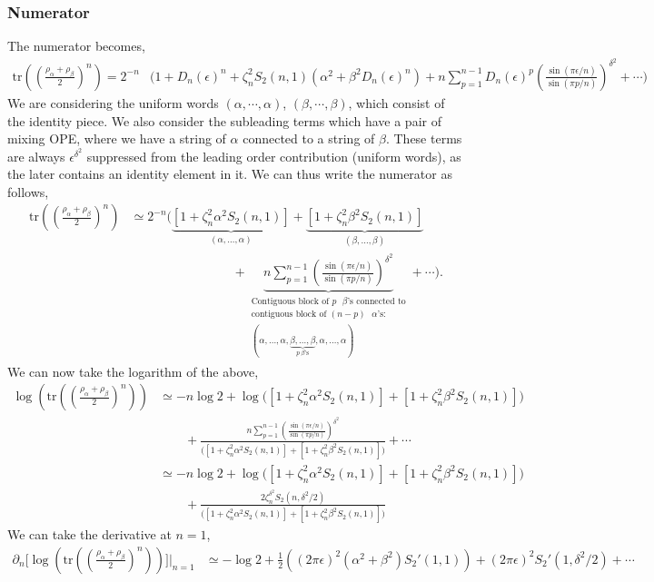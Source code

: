 \documentclass[11pt]{article}
\newcommand{\ep}{\epsilon}
\newcommand{\p}{\partial}
\newcommand{\nn}{\nonumber}
\newcommand{\lb}{\left(}
\newcommand{\rb}{\right)}
\begin{document}
\subsubsection{Numerator}
The numerator becomes,
\begin{align}
    \text{tr}\lb\lb \frac{ \rho_\alpha + \rho_\beta}{2}\rb^n\rb =2^{-n}&\Bigg( 1+ D_n(\ep)^n + \zeta_n^2S_2(n,1)\lb \alpha^2 + \beta^2 D_n(\ep)^n\rb +  n\sum_{p=1}^{n-1}D_n(\ep)^p \lb\frac{\sin(\pi\ep/n)}{\sin(\pi p/n)}\rb^{\delta^2} + \cdots \Bigg)
\end{align}
We are considering the uniform words  $(\alpha,\cdots,\alpha)$, $(\beta,\cdots,\beta)$, which consist of the identity piece. We also consider the subleading terms which have a pair of mixing OPE, where we have a string of $\alpha$ connected to a string of $\beta$. These terms are always $\ep^{\delta^2}$ suppressed from the leading order contribution (uniform words), as the later contains an identity element in it. We can thus write the numerator as follows,
\begin{align}
\text{tr}\lb\lb \frac{ \rho_\alpha + \rho_\beta}{2}\rb^n\rb &\simeq2^{-n}\Bigg(
\underbrace{
    \left[1+\zeta_n^2\alpha^2 S_2(n,1)\right]
}_{(\alpha,\ldots,\alpha)}
+
\underbrace{
    \left[1+\zeta_n^2\beta^2 S_2(n,1)\right]
}_{(\beta,\ldots,\beta)}
\nn\\
&\qquad \qquad \qquad\qquad
+\underbrace{n
    \sum_{p=1}^{n-1}
    \left(
        \frac{\sin(\pi\ep/n)}
             {\sin(\pi p/n)}
    \right)^{\delta^2}
}_{\substack{
    \text{Contiguous block of \(p\) \(\beta\)'s connected to} \\ \text{contiguous block of \((n-p)\) \(\alpha\)'s:}\\
    \displaystyle
    (\alpha,\ldots,\alpha,
    \underbrace{\beta,\ldots,\beta}_{p\ \beta\text{'s}},
    \alpha,\ldots,\alpha)
}}
+\cdots
\Bigg).
\end{align}
We can now take the logarithm of the above, 
\begin{align}
    \log \lb\text{tr}\lb\lb \frac{ \rho_\alpha + \rho_\beta}{2}\rb^n\rb \rb &\simeq -n \log 2 + \log \Big( \left[1+\zeta_n^2 \alpha^2 S_2(n,1)\right] + \left[1+\zeta_n^2 \beta^2 S_2(n,1)\right] \Big) \nn\\
    &\qquad + \frac{n
    \sum_{p=1}^{n-1}
    \left(
        \frac{\sin(\pi\ep/n)}
             {\sin(\pi p/n)}
    \right)^{\delta^2}}{\Big( \left[1+\zeta_n^2 \alpha^2 S_2(n,1)\right] + \left[1+\zeta_n^2 \beta^2 S_2(n,1)\right] \Big)} + \cdots \\
    &\simeq  -n \log 2 + \log \Big( \left[1+\zeta_n^2 \alpha^2 S_2(n,1)\right] + \left[1+\zeta_n^2 \beta^2 S_2(n,1)\right] \Big) \nn\\
    &\qquad + \frac{2\zeta_n^{\delta^2}S_2(n,\delta^2/2)}{\Big( \left[1+\zeta_n^2 \alpha^2 S_2(n,1)\right] + \left[1+\zeta_n^2 \beta^2 S_2(n,1)\right] \Big)}
\end{align}
We can take the derivative at $n=1$,
\begin{align}
    \p_n  \Bigg[ \log \lb\text{tr}\lb\lb \frac{ \rho_\alpha + \rho_\beta}{2}\rb^n\rb \rb \Bigg]\Bigg|_{n=1} &\simeq -\log 2 + \frac{1}{2}\lb \lb2\pi \ep \rb^2 \lb\alpha^2 + \beta^2\rb S_2'(1,1)\rb  +   \lb2\pi \ep\rb^2 S_2'(1,\delta^2/2) + \cdots
\end{align}
\end{document}

